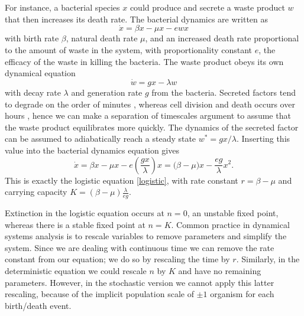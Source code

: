 For instance, a bacterial species $x$ could produce and secrete a waste product $w$ that then increases its death rate. 
The bacterial dynamics are written as
\begin{equation}
\dot{x} = \beta x - \mu x - e w x
\end{equation}
with birth rate $\beta$, natural death rate $\mu$, and an increased death rate proportional to the amount of waste in the system, with proportionality constant $e$, the efficacy of the waste in killing the bacteria. 
The waste product obeys its own dynamical equation
\begin{equation}
\dot{w} = g x - \lambda w
\end{equation}
with decay rate $\lambda$ and generation rate $g$ from the bacteria. 
Secreted factors tend to degrade on the order of minutes \cite{Belle2006}, whereas cell division and death occurs over hours \cite{Powell1956,Lenski1991}, hence we can make a separation of timescales argument to assume that the waste product equilibrates more quickly. 
The dynamics of the secreted factor can be assumed to adiabatically reach a steady state $w^* = g x/\lambda$. 
Inserting this value into the bacterial dynamics equation gives
\begin{equation}
\dot{x} = \beta x - \mu x - e \left( \frac{g x}{\lambda} \right) x = \big( \beta - \mu \big) x - \frac{e g}{\lambda} x^2.
\end{equation}
This is exactly the logistic equation \ref{logistic}, with rate constant $r = \beta - \mu$ and carrying capacity $K = \left( \beta - \mu \right) \frac{\lambda}{e g}$. 

Extinction in the logistic equation occurs at $n=0$, an unstable fixed point, whereas there is a stable fixed point at $n=K$. %
Common practice in dynamical systems analysis is to rescale variables to remove parameters and simplify the system.
Since we are dealing with continuous time we can remove the rate constant from our equation; we do so by rescaling the time by $r$.
Similarly, in the deterministic equation we could rescale $n$ by $K$ and have no remaining parameters.
However, in the stochastic version we cannot apply this latter rescaling, because of the implicit population scale of $\pm1$ organism for each birth/death event. %

